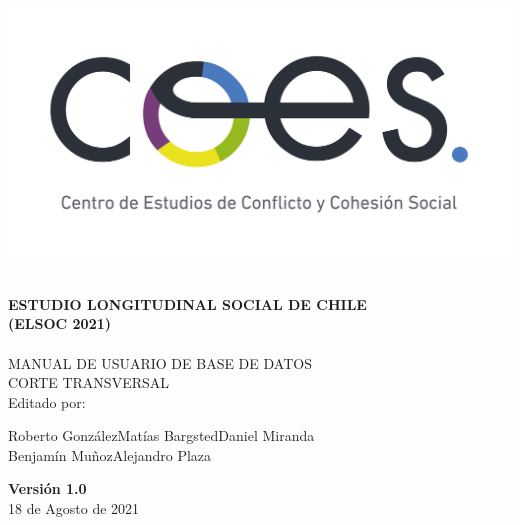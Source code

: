 \begin{titlepage}
	\centering
	\includegraphics[width=16cm]{coes_blanco_esp.jpg}

\HRule{1.4pt} \\
\LARGE \textbf{\uppercase{Estudio Longitudinal Social de Chile}}\\
\LARGE \textbf{\uppercase{(ELSOC 2021)}}\\

\HRule{1.4pt} \\ [0.2cm]

\normalsize  \vspace*{0.2\baselineskip}
 \large \textsc{MANUAL DE USUARIO DE BASE DE DATOS\\ 	CORTE TRANSVERSAL}
\\ [0.2cm]
\vspace*{0.9cm}
Editado por:\\
\begin{center}
Roberto González\hspace*{1.25cm}Matías Bargsted\hspace*{1.25cm}Daniel Miranda\\
Benjamín Muñoz\hspace*{1.5cm}Alejandro Plaza\\
\end{center}
\vspace*{1.3cm}
\textbf{Versión 1.0}\\
18 de Agosto de  2021\\
\end{titlepage}

\newpage

\thispagestyle{empty}
\begin{minipage}[b]{1\linewidth}
    \tableofcontents
\end{minipage}

\begin{minipage}[b]{1\linewidth}
    \listoftables
\end{minipage}

\begin{minipage}[b]{1\linewidth}
    \listoffigures
\end{minipage}

